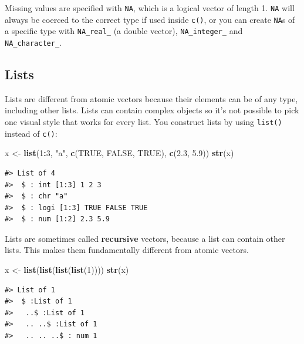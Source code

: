 \documentclass[]{book}
\newenvironment{Shaded}{\begin{snugshade}}{\end{snugshade}}
\newcommand{\KeywordTok}[1]{\textcolor[rgb]{0.13,0.29,0.53}{\textbf{#1}}}
\newcommand{\DecValTok}[1]{\textcolor[rgb]{0.00,0.00,0.81}{#1}}
\newcommand{\FloatTok}[1]{\textcolor[rgb]{0.00,0.00,0.81}{#1}}
\newcommand{\StringTok}[1]{\textcolor[rgb]{0.31,0.60,0.02}{#1}}
\newcommand{\OtherTok}[1]{\textcolor[rgb]{0.56,0.35,0.01}{#1}}
\newcommand{\OperatorTok}[1]{\textcolor[rgb]{0.81,0.36,0.00}{\textbf{#1}}}
\newcommand{\NormalTok}[1]{#1}
\theoremstyle{definition}
\theoremstyle{definition}
\theoremstyle{definition}
\theoremstyle{remark}
\begin{document}
Missing values are specified with \texttt{NA}, which is a logical vector
of length 1. \texttt{NA} will always be coerced to the correct type if
used inside \texttt{c()}, or you can create \texttt{NA}s of a specific
type with \texttt{NA\_real\_} (a double vector), \texttt{NA\_integer\_}
and \texttt{NA\_character\_}.

\subsection{Lists}\label{lists}

Lists are different from atomic vectors because their elements can be of
any type, including other lists. Lists can contain complex objects so
it's not possible to pick one visual style that works for every list.
You construct lists by using \texttt{list()} instead of \texttt{c()}:

\begin{Shaded}
\begin{Highlighting}[]
\NormalTok{x <-}\StringTok{ }\KeywordTok{list}\NormalTok{(}\DecValTok{1}\OperatorTok{:}\DecValTok{3}\NormalTok{, }\StringTok{"a"}\NormalTok{, }\KeywordTok{c}\NormalTok{(}\OtherTok{TRUE}\NormalTok{, }\OtherTok{FALSE}\NormalTok{, }\OtherTok{TRUE}\NormalTok{), }\KeywordTok{c}\NormalTok{(}\FloatTok{2.3}\NormalTok{, }\FloatTok{5.9}\NormalTok{))}
\KeywordTok{str}\NormalTok{(x)}
\end{Highlighting}
\end{Shaded}

\begin{verbatim}
#> List of 4
#>  $ : int [1:3] 1 2 3
#>  $ : chr "a"
#>  $ : logi [1:3] TRUE FALSE TRUE
#>  $ : num [1:2] 2.3 5.9
\end{verbatim}

Lists are sometimes called \textbf{recursive} vectors, because a list
can contain other lists. This makes them fundamentally different from
atomic vectors.

\begin{Shaded}
\begin{Highlighting}[]
\NormalTok{x <-}\StringTok{ }\KeywordTok{list}\NormalTok{(}\KeywordTok{list}\NormalTok{(}\KeywordTok{list}\NormalTok{(}\KeywordTok{list}\NormalTok{(}\DecValTok{1}\NormalTok{))))}
\KeywordTok{str}\NormalTok{(x)}
\end{Highlighting}
\end{Shaded}

\begin{verbatim}
#> List of 1
#>  $ :List of 1
#>   ..$ :List of 1
#>   .. ..$ :List of 1
#>   .. .. ..$ : num 1
\end{verbatim}
\end{document}
